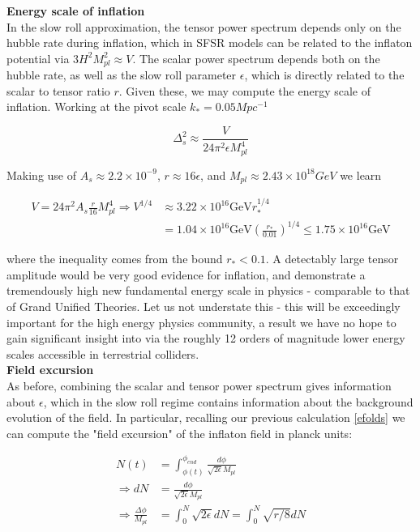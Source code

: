 \documentclass[a4paper,10pt]{article}
\newcommand{\Mp}{M_{pl}}
\begin{document}
\textbf{Energy scale of inflation} \\

In the slow roll approximation, the tensor power spectrum depends only on the hubble rate during inflation, which in SFSR models can be related to the inflaton potential via $3H^2\Mp^2\approx V$. The scalar power spectrum depends both on the hubble rate, as well as the slow roll parameter $\epsilon$, which is directly related to the scalar to tensor ratio $r$. Given these, we may compute the energy scale of inflation. Working at the pivot scale $k_* = 0.05Mpc^{-1}$

\begin{equation}
\Delta^2_{s}\approx \frac{V}{24\pi^2\epsilon\Mp^4}
\end{equation}

Making use of $ A_s \approx 2.2\times10^{-9}$, $r\approx 16\epsilon$, and $\Mp \approx 2.43\times 10^{18} GeV$ we learn

\begin{equation}\begin{split}
V=24\pi^2A_s\frac{r}{16}\Mp^4 \Rightarrow V^{1/4} &\approx 3.22\times10^{16}\text{GeV}r_*^{1/4}\\
&= 1.04\times10^{16}\text{GeV}(\frac{r_*}{0.01})^{1/4} \leq 1.75\times10^{16}\text{GeV}
\end{split}\end{equation}

where the inequality comes from the  bound $r_*<0.1$. A detectably large tensor amplitude would be very good evidence for inflation, and demonstrate a tremendously high new fundamental energy scale in physics - comparable to that of Grand Unified Theories. Let us not understate this - this will be exceedingly important for the high energy physics community, a result we have no hope to gain significant insight into via the roughly 12 orders of magnitude lower energy scales accessible in terrestrial colliders. \\

\textbf{Field excursion}\\

As before, combining the scalar and tensor power spectrum gives information about $\epsilon$, which in the slow roll regime contains information about the background evolution of the field. In particular, recalling our previous calculation \ref{efolds} we can compute the "field excursion" of the inflaton field in planck units:

\begin{equation}\begin{split}
N(t) &=  \int_{\phi(t)}^{\phi_{end}} \frac{d\phi}{\sqrt{2\epsilon}\Mp}\\
\Rightarrow dN&=\frac{d\phi}{\sqrt{2\epsilon}\Mp}\\
\Rightarrow \frac{\Delta \phi}{\Mp} &= \int_0^N \sqrt{2\epsilon} dN = \int_0^N \sqrt{r/8} dN 
\end{split}\end{equation}
\end{document}
